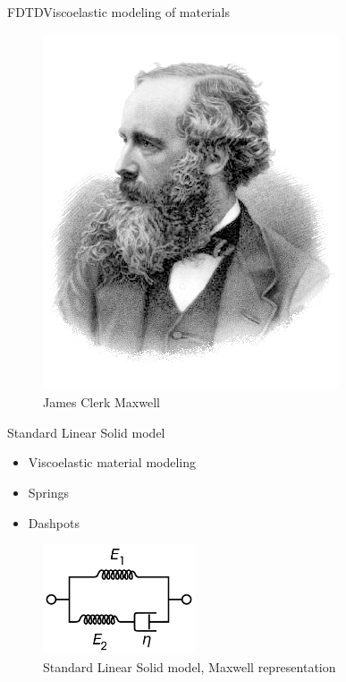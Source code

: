 \documentclass[9pt, xcolor={usenames, dvipsnames}]{beamer}
\begin{document}
				\begin{frame}{FDTD}{Viscoelastic modeling of materials}
					\centering
					\begin{minipage}[c]{0.3\textwidth}
						\begin{figure}
							\includegraphics[width=\textwidth]{images/profile/James_Clerk_Maxwell.png}
							\caption{James Clerk Maxwell}
						\end{figure}
					\end{minipage}
					\hfill
					\begin{minipage}[c]{0.6\textwidth}
						\begin{block}{Standard Linear Solid model}
							\begin{itemize}
								\item Viscoelastic material modeling 
								\item Springs
								\item Dashpots
							\end{itemize}
						\end{block}
						\begin{figure}
							\includegraphics[width=0.4\textwidth]{images/SLS.png}
							\caption{Standard Linear Solid model, Maxwell representation}
						\end{figure}
					\end{minipage}
				\end{frame}
\end{document}
